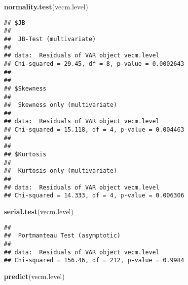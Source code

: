 \documentclass[]{book}
\newenvironment{Shaded}{\begin{snugshade}}{\end{snugshade}}
\newcommand{\KeywordTok}[1]{\textcolor[rgb]{0.13,0.29,0.53}{\textbf{#1}}}
\newcommand{\NormalTok}[1]{#1}
\theoremstyle{definition}
\theoremstyle{definition}
\theoremstyle{definition}
\theoremstyle{remark}
\begin{document}
\begin{Shaded}
\begin{Highlighting}[]
\KeywordTok{normality.test}\NormalTok{(vecm.level)}
\end{Highlighting}
\end{Shaded}

\begin{verbatim}
## $JB
## 
##  JB-Test (multivariate)
## 
## data:  Residuals of VAR object vecm.level
## Chi-squared = 29.45, df = 8, p-value = 0.0002643
## 
## 
## $Skewness
## 
##  Skewness only (multivariate)
## 
## data:  Residuals of VAR object vecm.level
## Chi-squared = 15.118, df = 4, p-value = 0.004463
## 
## 
## $Kurtosis
## 
##  Kurtosis only (multivariate)
## 
## data:  Residuals of VAR object vecm.level
## Chi-squared = 14.333, df = 4, p-value = 0.006306
\end{verbatim}

\begin{Shaded}
\begin{Highlighting}[]
\KeywordTok{serial.test}\NormalTok{(vecm.level)}
\end{Highlighting}
\end{Shaded}

\begin{verbatim}
## 
##  Portmanteau Test (asymptotic)
## 
## data:  Residuals of VAR object vecm.level
## Chi-squared = 156.46, df = 212, p-value = 0.9984
\end{verbatim}

\begin{Shaded}
\begin{Highlighting}[]
\KeywordTok{predict}\NormalTok{(vecm.level)}
\end{Highlighting}
\end{Shaded}
\end{document}
